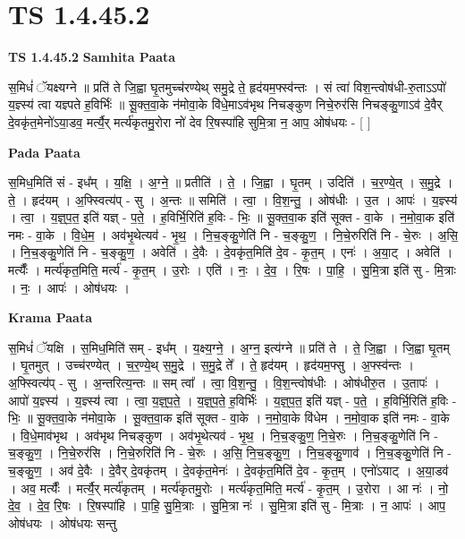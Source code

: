 \documentclass[17pt]{extarticle}
\begin{document}
\section{ TS 1.4.45.2 }

\textbf{TS 1.4.45.2 } \newline
\textbf{Samhita Paata} \newline

स॒मिधं॑ ॅयक्ष्यग्ने ॥ प्रति॑ ते जि॒ह्वा घृ॒तमुच्च॑रण्येथ् समु॒द्रे ते॒ हृद॑यम॒फ्स्व॑न्तः । सं त्वा॑ विश॒न्त्वोष॑धी-रु॒ताऽऽपो॑ य॒ज्ञ्स्य॑ त्वा यज्ञ्पते ह॒विर्भिः॑ ॥ सू॒क्त॒वा॒के न॑मोवा॒के वि॑धे॒माऽव॑भृथ निचङ्कुण निचे॒रुर॑सि निचङ्कु॒णाऽव॑ दे॒वैर् दे॒वकृ॑त॒मेनो॑ऽया॒डव॒ मर्त्यै॒र् मर्त्य॑कृतमु॒रोरा नो॑ देव रि॒षस्पा॑हि सुमि॒त्रा न॒ आप॒ ओष॑धयः - [ ] \newline

\textbf{Pada Paata} \newline

स॒मिध॒मिति॑ सं - इध᳚म् । य॒क्षि॒ । अ॒ग्ने॒ ॥ प्रतीति॑ । ते॒ । जि॒ह्वा । घृ॒तम् । उदिति॑ । च॒र॒ण्ये॒त् । स॒मु॒द्रे । ते॒ । हृद॑यम् । अ॒फ्स्वित्य॑प् - सु । अ॒न्तः ॥ समिति॑ । त्वा॒ । वि॒श॒न्तु॒ । ओष॑धीः । उ॒त । आपः॑ । य॒ज्ञ्स्य॑ । त्वा॒ । य॒ज्ञ्॒प॒त॒ इति॑ यज्ञ् - प॒ते॒ । ह॒विर्भि॒रिति॑ ह॒विः - भिः॒ ॥ सू॒क्त॒वा॒क इति॑ सूक्त - वा॒के । न॒मो॒वा॒क इति॑ नमः - वा॒के । वि॒धे॒म॒ । अव॑भृ॒थेत्यव॑ - भृ॒थ॒ । नि॒च॒ङ्कु॒णेति॑ नि - च॒ङ्कु॒ण॒ । नि॒चे॒रुरिति॑ नि - चे॒रुः । अ॒सि॒ । नि॒च॒ङ्कु॒णेति॑ नि - च॒ङ्कु॒ण॒ । अवेति॑ । दे॒वैः । दे॒वकृ॑त॒मिति॑ दे॒व - कृ॒त॒म् । एनः॑ । अ॒या॒ट् । अवेति॑ । मर्त्यैः᳚ । मर्त्य॑कृत॒मिति॒ मर्त्य॑ - कृ॒त॒म् । उ॒रोः । एति॑ । नः॒ । दे॒व॒ । रि॒षः । पा॒हि॒ । सु॒मि॒त्रा इति॑ सु - मि॒त्राः । नः॒ । आपः॑ । ओष॑धयः ।  \newline


\textbf{Krama Paata} \newline

स॒मिधं॑ ॅयक्षि । स॒मिध॒मिति॑ सम् - इध᳚म् । य॒क्ष्य॒ग्ने॒ । अ॒ग्न॒ इत्य॑ग्ने ॥ प्रति॑ ते । ते॒ जि॒ह्वा । जि॒ह्वा घृ॒तम् । घृ॒तमुत् । उच्च॑रण्येत् । च॒र॒ण्ये॒थ् स॒मु॒द्रे । स॒मु॒द्रे ते᳚ । ते॒ हृद॑यम् । हृद॑यम॒फ्सु । अ॒फ्स्व॑न्तः । अ॒फ्स्वित्य॑प् - सु । अ॒न्तरित्य॒न्तः ॥ सम् त्वा᳚ । त्वा॒ वि॒श॒न्तु॒ । वि॒श॒न्त्वोष॑धीः । ओष॑धीरु॒त । उ॒तापः॑ । आपो॑ य॒ज्ञ्स्य॑ । य॒ज्ञ्स्य॑ त्वा । त्वा॒ य॒ज्ञ्॒प॒ते॒ । य॒ज्ञ्॒प॒ते॒ ह॒विर्भिः॑ । य॒ज्ञ्॒प॒त॒ इति॑ यज्ञ् - प॒ते॒ । ह॒विर्भि॒रिति॑ ह॒विः - भिः॒ ॥ सू॒क्त॒वा॒के न॑मोवा॒के । सू॒क्त॒वा॒क इति॑ सूक्त - वा॒के । न॒मो॒वा॒के वि॑धेम । न॒मो॒वा॒क इति॑ नमः - वा॒के । वि॒धे॒माव॑भृथ । अव॑भृथ निचङ्कुण । अव॑भृ॒थेत्यव॑ - भृ॒थ॒ । नि॒च॒ङ्कु॒ण॒ नि॒चे॒रुः । नि॒च॒ङ्कु॒णेति॑ नि - च॒ङ्कु॒ण॒ । नि॒चे॒रुर॑सि । नि॒चे॒रुरिति॑ नि - चे॒रुः । अ॒सि॒ नि॒च॒ङ्कु॒ण॒ । नि॒च॒ङ्कु॒णाव॑ । नि॒च॒ङ्कु॒णेति॑ नि - च॒ङ्कु॒ण॒ । अव॑ दे॒वैः । दे॒वैर् दे॒वकृ॑तम् । दे॒वकृ॑त॒मेनः॑ । दे॒वकृ॑त॒मिति॑ दे॒व - कृ॒त॒म् । एनो॑ऽयाट् । अ॒या॒डव॑ । अव॒ मर्त्यैः᳚ । मर्त्यै॒र् मर्त्य॑कृतम् । मर्त्य॑कृतमु॒रोः । मर्त्य॑कृत॒मिति॒ मर्त्य॑ - कृ॒त॒म् । उ॒रोरा । आ नः॑ । नो॒ दे॒व॒ । दे॒व॒ रि॒षः । रि॒षस्पा॑हि । पा॒हि॒ सु॒मि॒त्राः । सु॒मि॒त्रा नः॑ । सु॒मि॒त्रा इति॑ सु - मि॒त्राः । न॒ आपः॑ । आप॒ ओष॑धयः । ओष॑धयः सन्तु \newline
\end{document}
